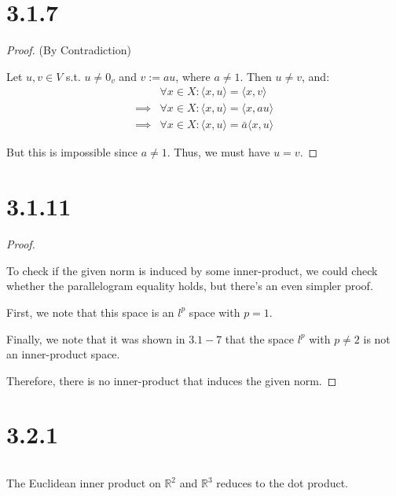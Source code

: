 \documentclass{article}
\begin{document}
\section*{3.1.7}
\begin{proof}(By Contradiction)
  $ $

  Let $u, v \in V$ s.t. $u \neq 0_v$ and $v := a u$, where $a \neq 1$. Then $u \neq v$, and:
  \begin{align*}
    &\forall x \in X: \langle x, u \rangle = \langle x, v \rangle \\
    \implies& \forall x \in X: \langle x, u \rangle = \langle x, au \rangle \\
    \implies& \forall x \in X: \langle x, u \rangle = \bar{a} \langle x, u \rangle
  \end{align*}

  But this is impossible since $a \neq 1$. Thus, we must have $u = v$.

\end{proof}

\section*{3.1.11}
\begin{proof}
  $ $

  To check if the given norm is induced by some inner-product, we could check whether the parallelogram equality holds, but there's an even simpler proof.
  \newline

  First, we note that this space is an $l^p$ space with $p=1$.
  \newline

  Finally, we note that it was shown in $3.1-7$ that the space $l^p$ with $p \neq 2$ is not an inner-product space.
  \newline
  
  Therefore, there is no inner-product that induces the given norm.

\end{proof}

\newpage


\section*{3.2.1}
$ $

The Euclidean inner product on $\mathbb{R}^2$ and $\mathbb{R}^3$ reduces to the dot product.
\newline
\end{document}
